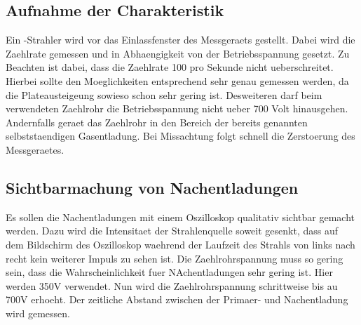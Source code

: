 \documentclass[titlepage=firstcover, captions=tableheading]{scrartcl}
\begin{document}
\subsection{Aufnahme der Charakteristik}
Ein \beta-Strahler wird vor das Einlassfenster des Messgeraets gestellt. Dabei wird die Zaehlrate gemessen und in Abhaengigkeit von der Betriebsspannung gesetzt. Zu Beachten ist dabei, dass die Zaehlrate 100 pro Sekunde nicht ueberschreitet. Hierbei sollte den Moeglichkeiten entsprechend sehr genau gemessen werden, da die Plateausteigeung sowieso schon sehr gering ist. Desweiteren darf beim verwendeten Zaehlrohr die Betriebsspannung nicht ueber 700 Volt hinausgehen. Andernfalls geraet das Zaehlrohr in den Bereich der bereits genannten selbststaendigen Gasentladung. Bei Missachtung folgt schnell die Zerstoerung des Messgeraetes. 
\subsection{Sichtbarmachung von Nachentladungen}
Es sollen die Nachentladungen mit einem Oszilloskop qualitativ sichtbar gemacht werden. Dazu wird die Intensitaet der Strahlenquelle soweit gesenkt, dass auf dem Bildschirm des Oszilloskop waehrend der Laufzeit des Strahls von links nach recht kein weiterer Impuls zu sehen ist. Die Zaehlrohrspannung muss so gering sein, dass die Wahrscheinlichkeit fuer NAchentladungen sehr gering ist. Hier werden 350V verwendet. Nun wird die Zaehlrohrspannung schrittweise bis au 700V erhoeht. Der zeitliche Abstand zwischen der Primaer- und Nachentladung wird gemessen.
\end{document}
